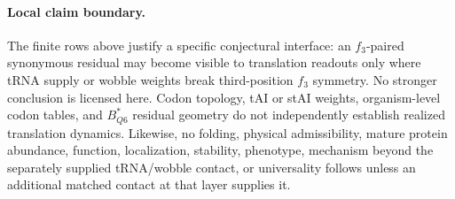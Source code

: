 \paragraph{Local claim boundary.}
The finite rows above justify a specific conjectural interface: an $f_3$-paired synonymous residual may become visible to translation readouts only where tRNA supply or wobble weights break third-position $f_3$ symmetry. No stronger conclusion is licensed here. Codon topology, tAI or stAI weights, organism-level codon tables, and $B^*_{Q6}$ residual geometry do not independently establish realized translation dynamics. Likewise, no folding, physical admissibility, mature protein abundance, function, localization, stability, phenotype, mechanism beyond the separately supplied tRNA/wobble contact, or universality follows unless an additional matched contact at that layer supplies it.
